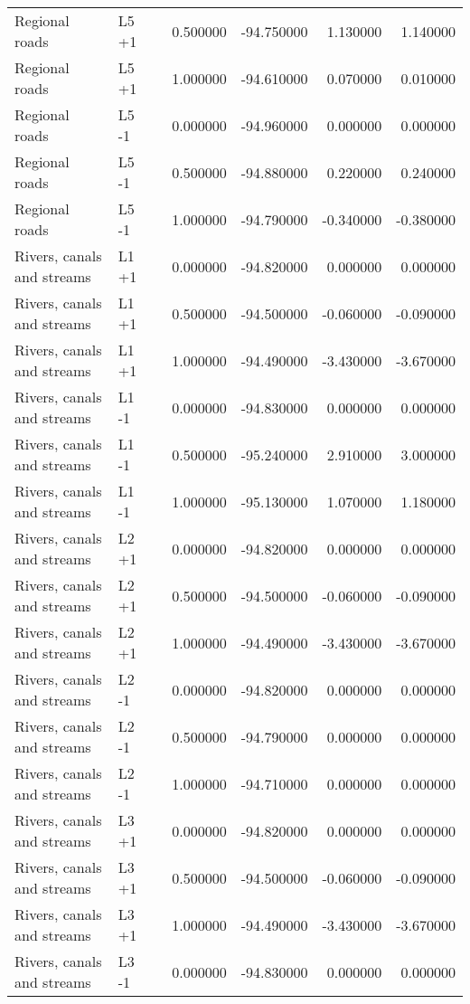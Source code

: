 \begin{tabular}{lllrrrr}
Regional roads & L5 +1 &  & 0.500000 & -94.750000 & 1.130000 & 1.140000 \\
Regional roads & L5 +1 &  & 1.000000 & -94.610000 & 0.070000 & 0.010000 \\
Regional roads & L5 -1 &  & 0.000000 & -94.960000 & 0.000000 & 0.000000 \\
Regional roads & L5 -1 &  & 0.500000 & -94.880000 & 0.220000 & 0.240000 \\
Regional roads & L5 -1 &  & 1.000000 & -94.790000 & -0.340000 & -0.380000 \\
Rivers, canals and streams & L1 +1 &  & 0.000000 & -94.820000 & 0.000000 & 0.000000 \\
Rivers, canals and streams & L1 +1 &  & 0.500000 & -94.500000 & -0.060000 & -0.090000 \\
Rivers, canals and streams & L1 +1 &  & 1.000000 & -94.490000 & -3.430000 & -3.670000 \\
Rivers, canals and streams & L1 -1 &  & 0.000000 & -94.830000 & 0.000000 & 0.000000 \\
Rivers, canals and streams & L1 -1 &  & 0.500000 & -95.240000 & 2.910000 & 3.000000 \\
Rivers, canals and streams & L1 -1 &  & 1.000000 & -95.130000 & 1.070000 & 1.180000 \\
Rivers, canals and streams & L2 +1 &  & 0.000000 & -94.820000 & 0.000000 & 0.000000 \\
Rivers, canals and streams & L2 +1 &  & 0.500000 & -94.500000 & -0.060000 & -0.090000 \\
Rivers, canals and streams & L2 +1 &  & 1.000000 & -94.490000 & -3.430000 & -3.670000 \\
Rivers, canals and streams & L2 -1 &  & 0.000000 & -94.820000 & 0.000000 & 0.000000 \\
Rivers, canals and streams & L2 -1 &  & 0.500000 & -94.790000 & 0.000000 & 0.000000 \\
Rivers, canals and streams & L2 -1 &  & 1.000000 & -94.710000 & 0.000000 & 0.000000 \\
Rivers, canals and streams & L3 +1 &  & 0.000000 & -94.820000 & 0.000000 & 0.000000 \\
Rivers, canals and streams & L3 +1 &  & 0.500000 & -94.500000 & -0.060000 & -0.090000 \\
Rivers, canals and streams & L3 +1 &  & 1.000000 & -94.490000 & -3.430000 & -3.670000 \\
Rivers, canals and streams & L3 -1 &  & 0.000000 & -94.830000 & 0.000000 & 0.000000 \\

\end{tabular}
